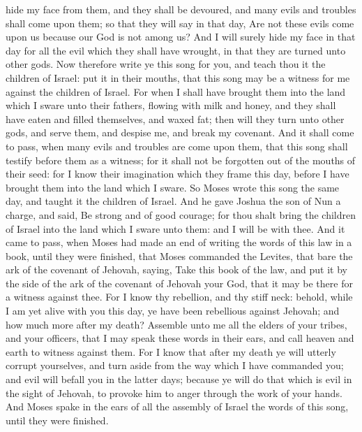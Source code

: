 hide my face from them, and they shall be devoured, and many evils and troubles shall come upon them; so that they will say in that day, Are not these evils come upon us because our God is not among us? And I will surely hide my face in that day for all the evil which they shall have wrought, in that they are turned unto other gods. Now therefore write ye this song for you, and teach thou it the children of Israel: put it in their mouths, that this song may be a witness for me against the children of Israel. For when I shall have brought them into the land which I sware unto their fathers, flowing with milk and honey, and they shall have eaten and filled themselves, and waxed fat; then will they turn unto other gods, and serve them, and despise me, and break my covenant. And it shall come to pass, when many evils and troubles are come upon them, that this song shall testify before them as a witness; for it shall not be forgotten out of the mouths of their seed: for I know their imagination which they frame this day, before I have brought them into the land which I sware. So Moses wrote this song the same day, and taught it the children of Israel. And he gave Joshua the son of Nun a charge, and said, Be strong and of good courage; for thou shalt bring the children of Israel into the land which I sware unto them: and I will be with thee.  And it came to pass, when Moses had made an end of writing the words of this law in a book, until they were finished, that Moses commanded the Levites, that bare the ark of the covenant of Jehovah, saying, Take this book of the law, and put it by the side of the ark of the covenant of Jehovah your God, that it may be there for a witness against thee. For I know thy rebellion, and thy stiff neck: behold, while I am yet alive with you this day, ye have been rebellious against Jehovah; and how much more after my death? Assemble unto me all the elders of your tribes, and your officers, that I may speak these words in their ears, and call heaven and earth to witness against them. For I know that after my death ye will utterly corrupt yourselves, and turn aside from the way which I have commanded you; and evil will befall you in the latter days; because ye will do that which is evil in the sight of Jehovah, to provoke him to anger through the work of your hands.  And Moses spake in the ears of all the assembly of Israel the words of this song, until they were finished. 

